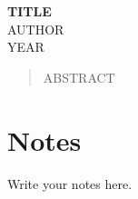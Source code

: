 \documentclass{article}
\begin{document}
\begin{center}
\Large{\textbf{TITLE}} \\ [0.2cm]
\small{\textsc{AUTHOR}} \\ [0.2cm]
\normalsize{\textsc{YEAR}} \\ [1cm]
\end{center}

\begin{abstract}
	ABSTRACT
\end{abstract}

\section{Notes}
	Write your notes here.
\end{document}
